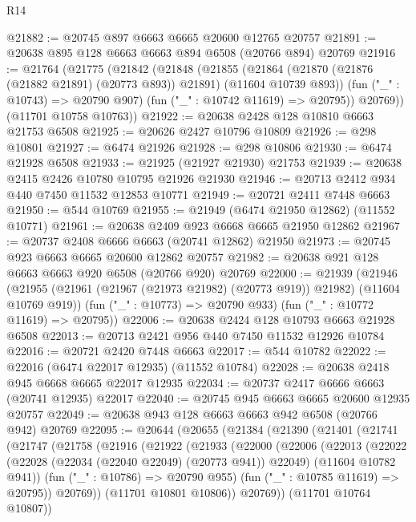 \begin{lexlean}{R14}
\begin{coremodule}
{{{{{{{{{{{{{{{{{{{{{{{{{{{{{{{{{{{{{{{{{{{{{{{{{{{{{{{{{{{{{{{{{{{{{{{{{{{{{{{{{{@21882 := @20745 @897 @6663 @6665 @20600 @12765 @20757
@21891 := @20638 @895 @128 @6663 @6663 @894 @6508 (@20766 @894) @20769
@21916 := @21764
    (@21775
      (@21842
        (@21848
          (@21855
            (@21864 (@21870 (@21876 (@21882 @21891) (@20773 @893)) @21891) (@11604 @10739 @893))
            (fun ("_" : @10743) => @20790 @907)
            (fun ("_" : @10742 @11619) => @20795))
          @20769))
      (@11701 @10758 @10763))
@21922 := @20638 @2428 @128 @10810 @6663 @21753 @6508
@21925 := @20626 @2427 @10796 @10809
@21926 := @298 @10801
@21927 := @6474 @21926
@21928 := @298 @10806
@21930 := @6474 @21928 @6508
@21933 := @21925 (@21927 @21930) @21753
@21939 := @20638 @2415 @2426 @10780 @10795 @21926 @21930
@21946 := @20713 @2412 @934 @440 @7450 @11532 @12853 @10771
@21949 := @20721 @2411 @7448 @6663
@21950 := @544 @10769
@21955 := @21949 (@6474 @21950 @12862) (@11552 @10771)
@21961 := @20638 @2409 @923 @6668 @6665 @21950 @12862
@21967 := @20737 @2408 @6666 @6663 (@20741 @12862) @21950
@21973 := @20745 @923 @6663 @6665 @20600 @12862 @20757
@21982 := @20638 @921 @128 @6663 @6663 @920 @6508 (@20766 @920) @20769
@22000 := @21939
    (@21946
      (@21955 (@21961 (@21967 (@21973 @21982) (@20773 @919)) @21982) (@11604 @10769 @919))
      (fun ("_" : @10773) => @20790 @933)
      (fun ("_" : @10772 @11619) => @20795))
@22006 := @20638 @2424 @128 @10793 @6663 @21928 @6508
@22013 := @20713 @2421 @956 @440 @7450 @11532 @12926 @10784
@22016 := @20721 @2420 @7448 @6663
@22017 := @544 @10782
@22022 := @22016 (@6474 @22017 @12935) (@11552 @10784)
@22028 := @20638 @2418 @945 @6668 @6665 @22017 @12935
@22034 := @20737 @2417 @6666 @6663 (@20741 @12935) @22017
@22040 := @20745 @945 @6663 @6665 @20600 @12935 @20757
@22049 := @20638 @943 @128 @6663 @6663 @942 @6508 (@20766 @942) @20769
@22095 := @20644
    (@20655
      (@21384
        (@21390
          (@21401
            (@21741
              (@21747
                (@21758
                  (@21916
                    (@21922
                      (@21933
                        (@22000
                          (@22006
                            (@22013
                              (@22022
                                (@22028 (@22034 (@22040 @22049) (@20773 @941)) @22049)
                                (@11604 @10782 @941))
                              (fun ("_" : @10786) => @20790 @955)
                              (fun ("_" : @10785 @11619) => @20795))
                            @20769))
                        (@11701 @10801 @10806))
                      @20769))
                  (@11701 @10764 @10807))
}}}}}}}}}}}}}}}}}}}}}}}}}}}}}}}}}}}}}}}}}}}}}}}}}}}}}}}}}}}}}}}}}}}}}}}}}}}}}}}}}}
\end{coremodule}
\end{lexlean}

